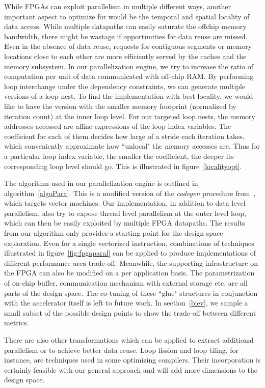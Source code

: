 While FPGAs can exploit parallelism in 
multiple different ways, another important aspect to optimize for would be the temporal and spatial locality of data access. While multiple datapaths can
easily saturate the offchip memory bandwidth, there might be wastage if opportunities for data reuse are missed. 
Even in the absence of data reuse, requests for 
contiguous segments or memory locations close to each other are more efficiently served by the caches and the memory subsystem.
In our parallelization engine, we try to increase the ratio of computation per unit of data communicated with off-chip RAM. By performing loop interchange under the dependency constraints, we can generate multiple versions of a loop nest. To find the implementation with best locality, we would like to have the version with the smaller
memory footprint (normalized by iteration count) at the inner loop level.
For our targeted loop nests, the memory addresses accessed are affine expressions of the loop index variables. The coefficient for each of them
decides how large of a stride each iteration takes, which conveniently
approximate how ``unlocal" the memory accesses are. 
Thus for a particular loop index variable, the smaller the coefficient, the deeper its corresponding loop level should go.
This is illustrated in figure~\ref{localityopt}. 

The algorithm used in our parallelization engine is outlined in algorithm~\ref{algoPara}. This is a modified version of the \textit{codegen}
procedure from~\cite{Kennedy:2001:OCM:502981}, which targets vector machines.
Our implementation, in addition to data level parallelism, also try to expose
thread level parallelism at the outer level loop, which can then be easily exploited by multiple FPGA datapaths. 
The results from our algorithm only provides a starting point for the design space exploration. Even for a single vectorized instruction, combinations of techniques illustrated in figure~\ref{fig:fpgaparal} can be applied to
produce implementations of different performance area trade-off. Meanwhile, 
the supporting infrastructure on the FPGA can also be modified on a per
application basis. The parametrization of on-chip buffer, communication mechanism with external
storage etc. are all parts of the design space. The co-tuning of these ``glue"
structures in conjunction
with the accelerator itself is left to future work.  In section~\ref{biev}, we sample a small subset of the possible design points
to show the trade-off between different metrics.


There are also other transformations which can be applied to extract additional parallelism or to achieve better data reuse. Loop fission and loop tiling, for instance, are techniques used in some optimizing compilers. 
Their incorporation is certainly feasible with our general approach and will
add more dimensions to the design space. 

